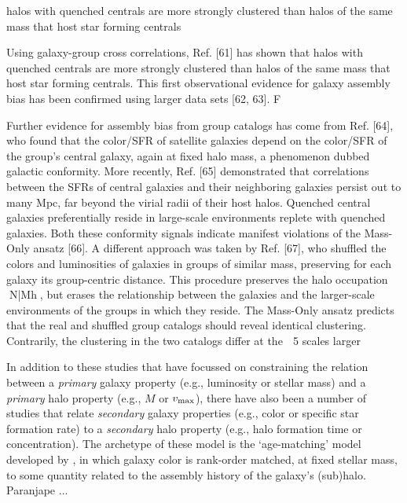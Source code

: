 \documentclass[usenatbib,usegraphicx,letterpaper]{mn2e}
\newcommand{\vmax}{v_{\rm max}}
\begin{document}
halos with quenched centrals are
more strongly clustered than halos of the same mass that host star
forming centrals \citep[see
  also][]{blanton_berlind07,wang_etal08,wang_etal13}

Using galaxy-group cross correlations, Ref. [61] has shown that halos
with quenched centrals are more strongly clustered than halos of the
same mass that host star forming centrals. This first observational
evidence for galaxy assembly bias has been confirmed using larger data
sets [62, 63]. F



Further evidence for assembly bias from group catalogs
has come from Ref. [64], who found that the color/SFR of satellite
galaxies depend on the color/SFR of the group’s central galaxy, again
at fixed halo mass, a phenomenon dubbed galactic conformity.  More
recently, Ref. [65] demonstrated that correlations between the SFRs of
central galaxies and their neighboring galaxies persist out to many
Mpc, far beyond the virial radii of their host halos.  Quenched
central galaxies preferentially reside in large-scale environments
replete with quenched galaxies. Both these conformity signals indicate
manifest violations of the Mass-Only ansatz [66].  A different
approach was taken by Ref. [67], who shuffled the colors and
luminosities of galaxies in groups of similar mass, preserving for
each galaxy its group-centric distance. This procedure preserves the
halo occupation N|Mh, but erases the relationship between the
galaxies and the larger-scale environments of the groups in which they
reside. The Mass-Only ansatz predicts that the real and shuffled group
catalogs should reveal identical clustering. Contrarily, the
clustering in the two catalogs differ at the ∼ 5%
scales larger

In addition to these studies that have focussed on constraining the
relation between a {\it primary} galaxy property (e.g., luminosity or
stellar mass) and a {\it primary} halo property (e.g., $M$ or
$\vmax$), there have also been a number of studies that relate
{\it secondary} galaxy properties (e.g., color or specific star
formation rate) to a {\it secondary} halo property (e.g., halo
formation time or concentration). The archetype of these model is the
`age-matching' model developed by \citet{HW13a}, in which galaxy color
is rank-order matched, at fixed stellar mass, to some quantity related
to the assembly history of the galaxy's (sub)halo.
Paranjape ...
\end{document}
